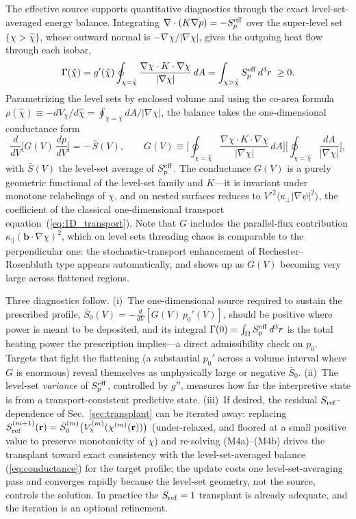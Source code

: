 \documentclass[english]{article}
\newcommand{\bb}{\mathbf{b}}
\newcommand{\br}{\mathbf{r}}
\begin{document}
The effective source supports quantitative diagnostics through the exact level-set-averaged energy
balance. Integrating $\nabla\cdot(K\nabla p)=-S_p^{\rm eff}$ over the super-level set
$\{\chi>\hat\chi\}$, whose outward normal is $-\nabla\chi/|\nabla\chi|$, gives the outgoing heat
flow through each isobar,
\begin{equation}
\Gamma(\hat\chi)=g'(\hat\chi)\oint_{\chi=\hat\chi}
\frac{\nabla\chi\cdot K\cdot\nabla\chi}{|\nabla\chi|}\,dA
=\int_{\chi>\hat\chi}S_p^{\rm eff}\,d^3r\;\ge0 .
\label{eq:levelset_balance}
\end{equation}
Parametrizing the level sets by enclosed volume and using the co-area formula
$\rho(\hat\chi)\equiv-dV_\chi/d\hat\chi=\oint_{\chi=\hat\chi}dA/|\nabla\chi|$, the balance takes
the one-dimensional conductance form
\begin{equation}
\frac{d}{dV}\Big[G(V)\,\frac{dp}{dV}\Big]=-\,\bar S(V),
\qquad
G(V)\equiv\bigg[\oint_{\chi=\hat\chi}\frac{\nabla\chi\cdot K\cdot\nabla\chi}{|\nabla\chi|}\,dA\bigg]
\bigg[\oint_{\chi=\hat\chi}\frac{dA}{|\nabla\chi|}\bigg] ,
\label{eq:conductance}
\end{equation}
with $\bar S(V)$ the level-set average of $S_p^{\rm eff}$. The conductance $G(V)$ is a purely
geometric functional of the level-set family and $K$---it is invariant under monotone relabelings
of $\chi$, and on nested surfaces reduces to $V'^2\langle\kappa_\perp|\nabla\psi|^{2}\rangle$, the
coefficient of the classical one-dimensional transport equation~(\ref{eq:1D_transport}). Note that
$G$ includes the parallel-flux contribution $\kappa_\parallel(\bb\cdot\nabla\chi)^{2}$, which on
level sets threading chaos is comparable to the perpendicular one: the stochastic-transport
enhancement of Rechester--Rosenbluth type \cite{rechester1978} appears automatically, and shows up
as $G(V)$ becoming very large across flattened regions.

Three diagnostics follow. (i)~The one-dimensional source required to sustain the prescribed
profile, $\bar S_0(V)=-\tfrac{d}{dV}[G(V)\,p_0'(V)]$, should be positive where power is meant to be
deposited, and its integral $\Gamma(0)=\int_\Omega S_p^{\rm eff}\,d^3r$ is the total heating power
the prescription implies---a direct admissibility check on $p_0$. Targets that fight the
flattening (a substantial $p_0'$ across a volume interval where $G$ is enormous) reveal themselves
as unphysically large or negative $\bar S_0$. (ii)~The level-set \emph{variance} of $S_p^{\rm
eff}$, controlled by $g''$, measures how far the interpretive state is from a
transport-consistent predictive state. (iii)~If desired, the residual $S_{\rm ref}$-dependence of
Sec.~\ref{sec:transplant} can be iterated away: replacing
$S_{\rm ref}^{(m+1)}(\br)=\bar S_0^{(m)}\big(V_\chi^{(m)}(\chi^{(m)}(\br))\big)$ (under-relaxed,
and floored at a small positive value to preserve monotonicity of $\chi$) and re-solving
(M4a)--(M4b) drives the transplant toward exact consistency with the level-set-averaged balance
(\ref{eq:conductance}) for the target profile; the update costs one level-set-averaging pass and
converges rapidly because the level-set geometry, not the source, controls the solution. In
practice the $S_{\rm ref}=1$ transplant is already adequate, and the iteration is an optional
refinement.
\end{document}
